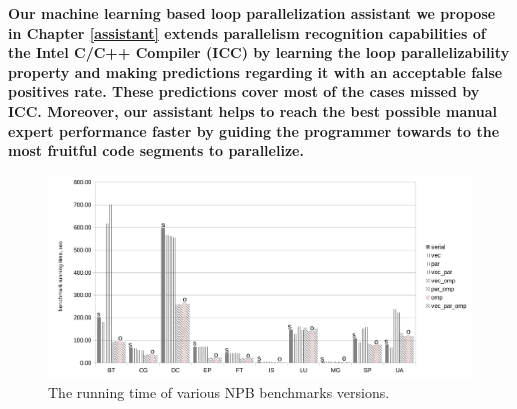 \textbf{\quad Our machine learning based loop parallelization assistant \cite{assistant-aiseps} we propose in Chapter \ref{assistant} extends parallelism recognition capabilities of the Intel C/C++ Compiler (ICC) by learning the loop parallelizability property and making predictions regarding it with an acceptable false positives rate. These predictions cover most of the cases missed by ICC. Moreover, our assistant helps to reach the best possible manual expert performance faster by guiding the programmer towards to the most fruitful code segments to parallelize.}
\begin{figure}[ht]
\includegraphics[width=1.0\textwidth]{images/benchmark_runtime.pdf}
\caption{The running time of various NPB benchmarks versions.}
\label{fig:benchmarks_runtime}
\end{figure}
